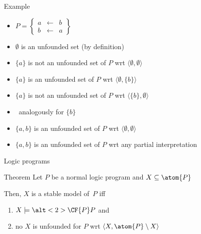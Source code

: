 \begin{frame}{Example}
  \bigskip
  \begin{itemize}
  \item<1->
    \(
    P
    =
    \left\{
      \begin{array}{lcl}
        a &\leftarrow & b \\
        b &\leftarrow & a
      \end{array}
    \right\}
    \)
    \bigskip
  \item<2-> $\emptyset$ is an unfounded set (by definition)
    \smallskip
  \item<3-> $\{a\}$ is not an unfounded set of $P$ wrt $\langle\emptyset,\emptyset\rangle$
  \item<4-> $\{a\}$ is     an unfounded set of $P$ wrt $\langle\emptyset,\{b\}\rangle$
  \item<5-> $\{a\}$ is not an unfounded set of $P$ wrt $\langle\{b\},\emptyset\rangle$
    \smallskip
  \item<6>[]\itarrow\ analogously for $\{b\}$
    \smallskip
  \item<7-> $\{a,b\}$ is     an unfounded set of $P$ wrt $\langle\emptyset,\emptyset\rangle$
  \item<8-> $\{a,b\}$ is     an unfounded set of $P$ wrt any partial interpretation
  \end{itemize}
\end{frame}
\begin{frame}{Logic programs}
  \bigskip
  \begin{center}
    \begin{minipage}[t]{0.92\linewidth}
      \begin{block}{ Theorem}
        Let $P$ be a normal logic program and $X\subseteq\atom{P}$
        \par\medskip
        Then, $X$ is a stable model of~$P$ iff
        \smallskip
        \begin{enumerate}
        \item $X\models\alt<2>{\CF{P}}{P}$ and
        \item no  $X$ is unfounded for $P$ wrt $\langle X,\atom{P}\setminus X \rangle$
        \end{enumerate}
      \end{block}
    \end{minipage}
  \end{center}
  \nocite{saczan90a,lee05a}
\end{frame}

